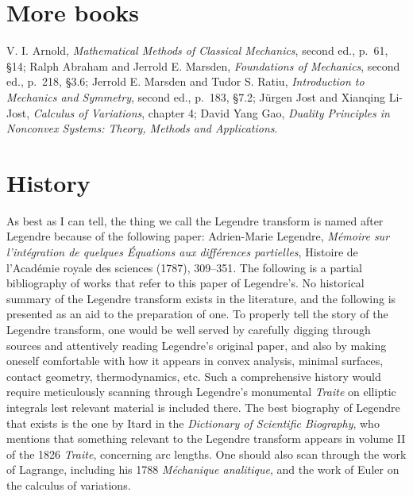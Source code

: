 \documentclass{article}
\theoremstyle{definition}
\begin{document}
\section{More books}
V. I. Arnold,
{\em Mathematical Methods of Classical Mechanics}, second ed., p.~61, \S 14; 
Ralph Abraham and Jerrold E. Marsden, {\em Foundations of Mechanics}, second ed., p.~218, \S 3.6;
Jerrold E. Marsden and Tudor S. Ratiu, {\em Introduction to Mechanics and Symmetry}, second ed., p.~183, \S 7.2; 
J\"urgen Jost and Xianqing Li-Jost, {\em Calculus of Variations}, chapter 4; David Yang Gao, {\em Duality Principles in Nonconvex Systems: Theory, Methods and Applications}.



\section{History}
As best as I can tell, the thing we call the Legendre transform is named after Legendre because of the following paper:
Adrien-Marie Legendre, {\em M\'emoire sur l'int\'egration de quelques 
\'Equations aux diff\'erences partielles}, 
Histoire de l'Acad\'emie royale des sciences (1787), 309--351.
The following is a partial bibliography of works that refer to this paper of Legendre's. No
historical summary of the Legendre transform exists in the literature, and the following is presented as an aid to the preparation of one.
To properly  tell the story of the Legendre transform, one would be well served by 
carefully digging through
sources and attentively reading Legendre's original paper, and also by making oneself comfortable with how it appears in 
convex analysis, minimal surfaces, contact geometry, thermodynamics, etc.
Such a comprehensive history would require meticulously scanning through 
Legendre's monumental {\em Traite} on elliptic integrals lest
relevant material is included there. The best biography of Legendre that exists
is the one by Itard in the {\em Dictionary of Scientific Biography},
who mentions that something relevant to the Legendre transform appears in volume II
of the 1826 {\em Traite}, concerning arc lengths. One should also scan through the work of Lagrange, including
his  1788 {\em M\'echanique analitique}, and the work of Euler on the calculus of variations.
\end{document}
